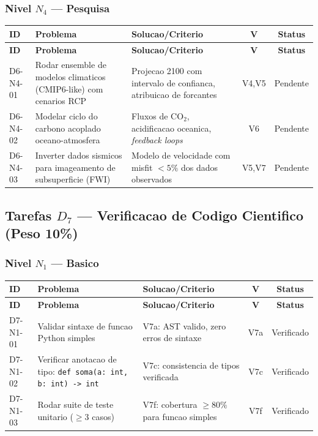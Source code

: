 \subsubsection{Nivel $N_4$ --- Pesquisa}

\begin{longtable}{|p{2.0cm}|p{4.2cm}|p{4.2cm}|c|c|}
\hline
\textbf{ID} & \textbf{Problema} & \textbf{Solucao/Criterio} & \textbf{V} & \textbf{Status} \\
\hline
\endfirsthead
\hline
\textbf{ID} & \textbf{Problema} & \textbf{Solucao/Criterio} & \textbf{V} & \textbf{Status} \\
\hline
\endhead
\hline
\endfoot
D6-N4-01 & Rodar ensemble de modelos climaticos (CMIP6-like) com cenarios RCP & Projecao 2100 com intervalo de confianca, atribuicao de forcantes & V4,V5 & Pendente \\
\hline
D6-N4-02 & Modelar ciclo do carbono acoplado oceano-atmosfera & Fluxos de CO$_{2}$, acidificacao oceanica, \textit{feedback loops} & V6 & Pendente \\
\hline
D6-N4-03 & Inverter dados sismicos para imageamento de subsuperficie (FWI) & Modelo de velocidade com misfit $<5\%$ dos dados observados & V5,V7 & Pendente \\
\hline
\end{longtable}

\subsection{Tarefas $D_7$ --- Verificacao de Codigo Cientifico (Peso 10\%)}

\subsubsection{Nivel $N_1$ --- Basico}

\begin{longtable}{|p{2.0cm}|p{4.2cm}|p{4.2cm}|c|c|}
\hline
\textbf{ID} & \textbf{Problema} & \textbf{Solucao/Criterio} & \textbf{V} & \textbf{Status} \\
\hline
\endfirsthead
\hline
\textbf{ID} & \textbf{Problema} & \textbf{Solucao/Criterio} & \textbf{V} & \textbf{Status} \\
\hline
\endhead
\hline
\endfoot
D7-N1-01 & Validar sintaxe de funcao Python simples & V7a: AST valido, zero erros de sintaxe & V7a & Verificado \\
\hline
D7-N1-02 & Verificar anotacao de tipo: \texttt{def soma(a: int, b: int) -> int} & V7c: consistencia de tipos verificada & V7c & Verificado \\
\hline
D7-N1-03 & Rodar suite de teste unitario ($\geq 3$ casos) & V7f: cobertura $\geq 80\%$ para funcao simples & V7f & Verificado \\
\hline
\end{longtable}

